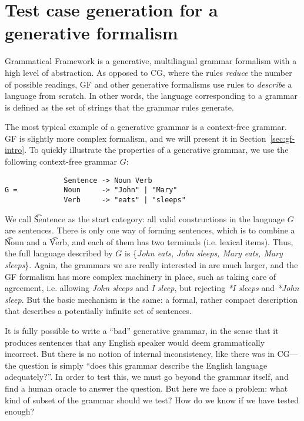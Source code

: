 \section{Test case generation for a generative formalism}

Grammatical Framework \cite{ranta2011gfbook} is a generative, multilingual grammar formalism with a high level of abstraction.
As opposed to CG, where the rules \emph{reduce} the number of possible readings, GF and other generative formalisms use rules to \emph{describe} a language from scratch. In other words, the language corresponding to a grammar is defined as the set of strings that the grammar rules generate.

The most typical example of a generative grammar is a context-free grammar. GF is slightly more complex formalism, and we will present it in Section~\ref{sec:gf-intro}. To quickly illustrate the properties of a generative grammar, we use the following context-free grammar $G$:

\begin{verbatim}
              Sentence -> Noun Verb
G =           Noun     -> "John" | "Mary"
              Verb     -> "eats" | "sleeps"
\end{verbatim}

We call \t{Sentence} as the start category: all valid constructions in the language $G$ are sentences. There is only one way of forming sentences, which is to combine a \t{Noun} and a \t{Verb}, and each of them has two terminals (i.e. lexical items). Thus, the full language described by $G$ is \{\emph{John eats, John sleeps, Mary eats, Mary sleeps}\}. Again, the grammars we are really interested in are much larger, and the GF formalism has more complex machinery in place, such as taking care of agreement, i.e. allowing \emph{John sleeps} and \emph{I sleep}, but rejecting \emph{*I sleeps} and \emph{*John sleep}. But the basic mechanism is the same: a formal, rather compact description that describes a potentially infinite set of sentences.

It is fully possible to write a ``bad'' generative grammar, in the sense that it produces sentences that any English speaker would deem grammatically incorrect. But there is no notion of internal inconsistency, like there was in CG---the question is simply ``does this grammar describe the English language adequately?''.
In order to test this, we must go beyond the grammar itself, and find a human oracle to answer the question.
But here we face a problem: what kind of subset of the grammar should we test? How do we know if we have tested enough?

